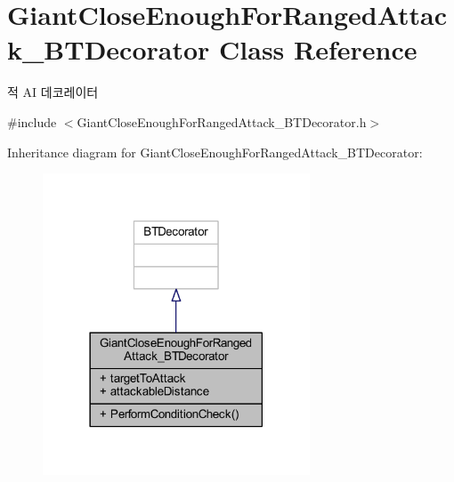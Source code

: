 \hypertarget{class_giant_close_enough_for_ranged_attack___b_t_decorator}{}\section{Giant\+Close\+Enough\+For\+Ranged\+Attack\+\_\+\+B\+T\+Decorator Class Reference}
\label{class_giant_close_enough_for_ranged_attack___b_t_decorator}


적 AI 데코레이터  




{\ttfamily \#include $<$Giant\+Close\+Enough\+For\+Ranged\+Attack\+\_\+\+B\+T\+Decorator.\+h$>$}



Inheritance diagram for Giant\+Close\+Enough\+For\+Ranged\+Attack\+\_\+\+B\+T\+Decorator\+:
\nopagebreak
\begin{figure}[H]
\begin{center}
\leavevmode
\includegraphics[width=225pt]{class_giant_close_enough_for_ranged_attack___b_t_decorator__inherit__graph}
\end{center}
\end{figure}


